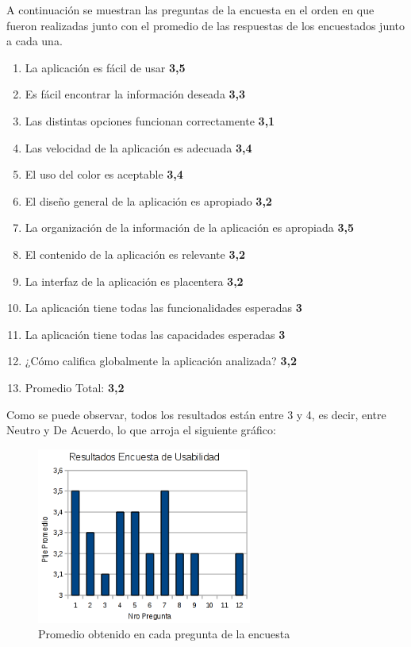 \documentclass[10pt,letterpaper]{article}
\begin{document}
A continuación se muestran las preguntas de la encuesta en el orden en que fueron realizadas junto con el promedio de las respuestas de los encuestados junto a cada una.\\

\begin{enumerate}
\item La aplicación es fácil de usar \textbf{3,5}
\item Es fácil encontrar la información deseada \textbf{3,3}
\item Las distintas opciones funcionan correctamente \textbf{3,1}
\item Las velocidad de la aplicación es adecuada \textbf{3,4}
\item El uso del color es aceptable \textbf{3,4}
\item El diseño general de la aplicación es apropiado \textbf{3,2}
\item La organización de la información de la aplicación es apropiada \textbf{3,5}
\item El contenido de la aplicación es relevante \textbf{3,2}
\item La interfaz de la aplicación es placentera \textbf{3,2}
\item La aplicación tiene todas las funcionalidades esperadas \textbf{3}
\item La aplicación tiene todas las capacidades esperadas \textbf{3}
\item ¿Cómo califica globalmente la aplicación analizada? \textbf{3,2}

\item Promedio Total: \textbf{3,2}
\end{enumerate}

\newpage
Como se puede observar, todos los resultados están entre 3 y 4, es decir, entre Neutro y De Acuerdo, lo que arroja el siguiente gráfico:\\

\begin{figure}[h]
\begin{center}
\includegraphics[width=200pt]{./imgs/encuesta.png}
\caption{Promedio obtenido en cada pregunta de la encuesta}
\end{center}
\end{figure}
\end{document}
